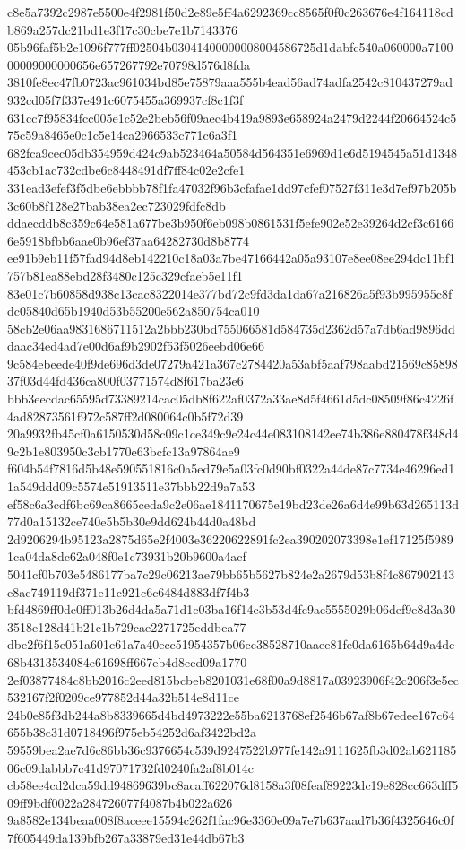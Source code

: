 \documentclass[11pt,a4paper]{article}
\begin{document}
{c8e5a7392c2987e5500e4f2981f50d2e89e5ff4a6292369cc8565f0f0c263676e4f164118cdb869a257dc21bd1e3f17c30cbe7e1b7143376
05b96faf5b2e1096f777ff02504b03041400000008004586725d1dabfc540a060000a710000009000000656e657267792e70798d576d8fda
3810fe8ec47fb0723ac961034bd85e75879aaa555b4ead56ad74adfa2542c810437279ad932cd05f7f337e491c6075455a369937cf8c1f3f
631cc7f95834fcc005e1c52e2beb56f09aec4b419a9893e658924a2479d2244f20664524c575c59a8465e0c1c5e14ca2966533c771c6a3f1
682fca9cec05db354959d424c9ab523464a50584d564351e6969d1e6d5194545a51d1348453cb1ac732cdbe6c8448491df7ff84c02e2cfe1
331ead3efef3f5dbe6ebbbb78f1fa47032f96b3cfafae1dd97cfef07527f311e3d7ef97b205b3c60b8f128e27bab38ea2ec723029fdfc8db
ddaecddb8c359c64e581a677be3b950f6eb098b0861531f5efe902e52e39264d2cf3c61666e5918bfbb6aae0b96ef37aa64282730d8b8774
ee91b9eb11f57fad94d8eb142210c18a03a7be47166442a05a93107e8ee08ee294dc11bf1757b81ea88ebd28f3480c125c329cfaeb5e11f1
83e01c7b60858d938c13cac8322014e377bd72c9fd3da1da67a216826a5f93b995955c8fdc05840d65b1940d53b55200e562a850754ca010
58cb2e06aa9831686711512a2bbb230bd755066581d584735d2362d57a7db6ad9896dddaac34ed4ad7e00d6af9b2902f53f5026eebd06e66
9c584ebeede40f9de696d3de07279a421a367c2784420a53abf5aaf798aabd21569c8589837f03d44fd436ca800f03771574d8f617ba23e6
bbb3eecdac65595d73389214cac05db8f622af0372a33ae8d5f4661d5dc08509f86c4226f4ad82873561f972c587ff2d080064c0b5f72d39
20a9932fb45cf0a6150530d58c09c1ce349c9e24c44e083108142ee74b386e880478f348d49c2b1e803950c3cb1770e63bcfc13a97864ae9
f604b54f7816d5b48e590551816c0a5ed79e5a03fc0d90bf0322a44de87c7734e46296ed11a549ddd09c5574e51913511e37bbb22d9a7a53
ef58c6a3cdf6bc69ca8665ceda9c2e06ae1841170675e19bd23de26a6d4e99b63d265113d77d0a15132ce740e5b5b30e9dd624b44d0a48bd
2d9206294b95123a2875d65e2f4003e36220622891fc2ea390202073398e1ef17125f59891ca04da8dc62a048f0e1c73931b20b9600a4acf
5041cf0b703e5486177ba7c29c06213ae79bb65b5627b824e2a2679d53b8f4c867902143c8ac749119df371e11c921c6c6484d883df7f4b3
bfd4869ff0dc0ff013b26d4da5a71d1c03ba16f14c3b53d4fc9ae5555029b06def9e8d3a303518e128d41b21c1b729cae2271725eddbea77
dbe2f6f15e051a601e61a7a40ecc51954357b06cc38528710aaee81fe0da6165b64d9a4dc68b4313534084e61698ff667eb4d8eed09a1770
2ef03877484c8bb2016c2eed815bcbeb8201031e68f00a9d8817a03923906f42c206f3e5ec532167f2f0209ce977852d44a32b514e8d11ce
24b0e85f3db244a8b8339665d4bd4973222e55ba6213768ef2546b67af8b67edee167c64655b38c31d0718496f975eb54252d6af3422bd2a
59559bea2ae7d6c86bb36c9376654c539d9247522b977fe142a9111625fb3d02ab62118506c09dabbb7c41d97071732fd0240fa2af8b014c
cb58ee4cd2dca59dd94869639bc8acaff622076d8158a3f08feaf89223dc19e828cc663dff509ff9bdf0022a284726077f4087b4b022a626
9a8582e134beaa008f8aceee15594c262f1fac96e3360e09a7e7b637aad7b36f4325646c0f7f605449da139bfb267a33879ed31e44db67b3
}
\end{document}
